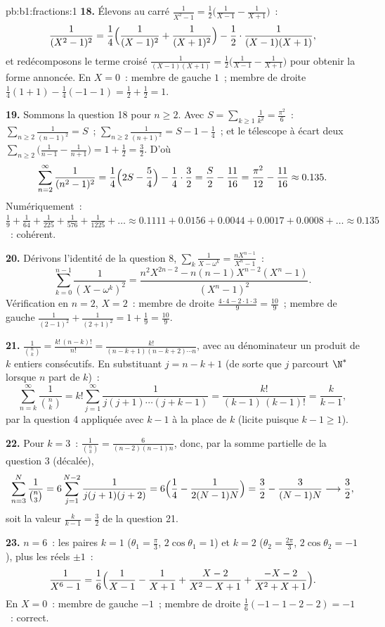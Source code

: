 \begin{solution}{pb:b1:fractions:1}
\textbf{18.} Élevons au carré $\frac1{X^2-1} = \frac12\bigl(\frac1{X-1}
- \frac1{X+1}\bigr)$~:
\[
\frac1{(X^2-1)^2} = \frac14\Bigl(\frac1{(X-1)^2} +
\frac1{(X+1)^2}\Bigr) - \frac12\cdot\frac1{(X-1)(X+1)} ,
\]
et redécomposons le terme croisé $\frac1{(X-1)(X+1)} =
\frac12\bigl(\frac1{X-1} - \frac1{X+1}\bigr)$ pour obtenir la forme
annoncée. En $X = 0$~: membre de gauche $1$~; membre de droite
$\frac14(1 + 1) - \frac14(-1 - 1) = \frac12 + \frac12 = 1$.

\textbf{19.} Sommons la question 18 pour $n \geq 2$. Avec $S =
\sum_{k\geq1}\frac1{k^2} = \frac{\pi^2}6$~: $\sum_{n\geq2}
\frac1{(n-1)^2} = S$~; $\sum_{n\geq2}\frac1{(n+1)^2} = S - 1 -
\frac14$~; et le télescope à écart deux $\sum_{n\geq2}\bigl(
\frac1{n-1} - \frac1{n+1}\bigr) = 1 + \frac12 = \frac32$. D'où
\[
\sum_{n=2}^{\infty}\frac1{(n^2-1)^2}
= \frac14\Bigl(2S - \frac54\Bigr) - \frac14\cdot\frac32
= \frac S2 - \frac{11}{16}
= \frac{\pi^2}{12} - \frac{11}{16} \approx 0.135 .
\]
Numériquement~: $\frac19 + \frac1{64} + \frac1{225} + \frac1{576} +
\frac1{1225} + \dots \approx 0.1111 + 0.0156 + 0.0044 + 0.0017 +
0.0008 + \dots \approx 0.135$~: cohérent.

\textbf{20.} Dérivons l'identité de la question 8,
$\sum_k\frac1{X-\omega^k} = \frac{nX^{n-1}}{X^n-1}$~:
\[
\sum_{k=0}^{n-1}\frac1{(X - \omega^k)^2}
= \frac{n^2X^{2n-2} - n(n-1)X^{n-2}(X^n - 1)}{(X^n - 1)^2} .
\]
Vérification en $n = 2$, $X = 2$~: membre de droite $\frac{4\cdot4 -
2\cdot1\cdot3}{9} = \frac{10}9$~; membre de gauche $\frac1{(2-1)^2} +
\frac1{(2+1)^2} = 1 + \frac19 = \frac{10}9$.

\textbf{21.} $\frac1{\binom nk} = \frac{k!\,(n-k)!}{n!} =
\frac{k!}{(n-k+1)(n-k+2)\cdots n}$, avec au dénominateur un produit de
$k$ entiers consécutifs. En substituant $j = n - k + 1$ (de sorte que
$j$ parcourt $\N^*$ lorsque $n$ part de $k$)~:
\[
\sum_{n=k}^{\infty}\frac1{\binom nk}
= k!\sum_{j=1}^{\infty}\frac1{j(j+1)\cdots(j+k-1)}
= \frac{k!}{(k-1)\,(k-1)!} = \frac{k}{k-1} ,
\]
par la question 4 appliquée avec $k - 1$ à la place de $k$ (licite
puisque $k - 1 \geq 1$).

\textbf{22.} Pour $k = 3$~: $\frac1{\binom n3} =
\frac6{(n-2)(n-1)n}$, donc, par la somme partielle de la question 3
(décalée),
\[
\sum_{n=3}^{N}\frac1{\binom n3}
= 6\sum_{j=1}^{N-2}\frac1{j(j+1)(j+2)}
= 6\Bigl(\frac14 - \frac1{2(N-1)N}\Bigr)
= \frac32 - \frac3{(N-1)N}
\longrightarrow \frac32 ,
\]
soit la valeur $\frac k{k-1} = \frac32$ de la question 21.

\textbf{23.} $n = 6$~: les paires $k = 1$ ($\theta_1 = \frac\pi3$,
$2\cos\theta_1 = 1$) et $k = 2$ ($\theta_2 = \frac{2\pi}3$,
$2\cos\theta_2 = -1$), plus les  réels $\pm1$~:
\[
\frac1{X^6-1} = \frac16\Bigl(\frac1{X-1} - \frac1{X+1}
+ \frac{X - 2}{X^2 - X + 1}
+ \frac{-X - 2}{X^2 + X + 1}\Bigr) .
\]
En $X = 0$~: membre de gauche $-1$~; membre de droite $\frac16(-1 - 1 -
2 - 2) = -1$~: correct.


\end{solution}
